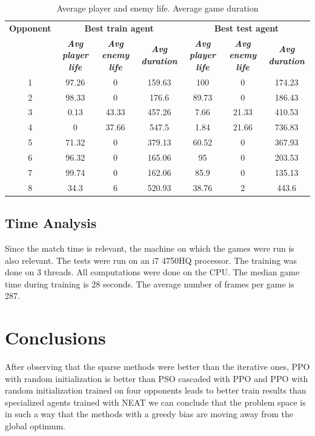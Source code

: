 \documentclass[conference]{IEEEtran}
\begin{document}
    \begin{table}[htbp]
        \caption{Average player and enemy life. Average game duration}
        \begin{center}
            \begin{tabular}{|c|c|c|c|c|c|c|}
                \hline
                \textbf{Opponent}&\multicolumn{3}{|c|}{\textbf{Best train agent}}&\multicolumn{3}{|c|}{\textbf{Best test agent}} \\
                \cline{2-7}
                & \textbf{\textit{Avg player life}}& \textbf{\textit{Avg enemy life}}& \textbf{\textit{Avg duration}} & \textbf{\textit{Avg player life}}& \textbf{\textit{Avg enemy life}}& \textbf{\textit{Avg duration}} \\
                \hline
                1 & 97.26 &     0 &  159.63 &    100 &     0 &  174.23 \\
                2 & 98.33 &     0 &   176.6 &  89.73 &     0 &  186.43 \\
                3 &  0.13 & 43.33 &  457.26 &   7.66 & 21.33 &  410.53 \\
                4 &     0 & 37.66 &   547.5 &   1.84 & 21.66 &  736.83 \\
                5 & 71.32 &     0 &  379.13 &  60.52 &     0 &  367.93 \\
                6 & 96.32 &     0 &  165.06 &     95 &     0 &  203.53 \\
                7 & 99.74 &     0 &  162.06 &   85.9 &     0 &  135.13 \\
                8 &  34.3 &     6 &  520.93 &  38.76 &     2 &   443.6 \\
                \hline
            \end{tabular}
        \end{center}
    \end{table}

    \subsection{Time Analysis}\label{subsec:time-analysis}
    Since the match time is relevant, the machine on which the games were run is also relevant.
    The tests were run on an i7 4750HQ processor.
    The training was done on 3 threads.
    All computations were done on the CPU\@.
    The median game time during training is 28 seconds.
    The average number of frames per game is 287.

    \section{Conclusions}\label{sec:conclusions}
    After observing that the sparse methods were better than the iterative ones,
    PPO with random initialization is better than PSO cascaded with PPO and
    PPO with random initialization trained on four opponents leads to better train results
    than specialized agents trained with NEAT we can conclude that the problem space is in such a
    way that the methods with a greedy bias are moving away from the global optimum.
\end{document}
